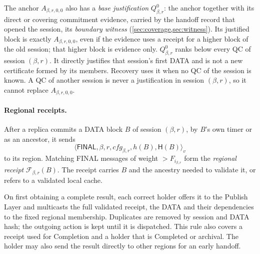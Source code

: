 \documentclass[11pt,a4paper]{article}
\newcommand{\FC}{\mathcal F}
\newcommand{\Hash}{\mathsf H}
\newcommand{\tagg}[1]{\ensuremath{\mathsf{#1}}}
\newcommand{\defterm}[1]{\textcolor{rrBlue}{\textit{#1}}}
\begin{document}
The anchor $A_{\beta,r,0,0}$ also has a \defterm{base justification}
$Q_{\beta,r}^0$: the anchor together with its direct or covering
commitment evidence, carried by the handoff record that opened the
session, its \defterm{boundary witness} (\cref{sec:coverage,sec:witness}). Its justified block is exactly
$A_{\beta,r,0,0}$, even if the evidence uses a receipt for a higher
block of the old session; that higher block is evidence only.
$Q_{\beta,r}^0$ ranks below every QC of session $(\beta,r)$.
It directly justifies that session's first DATA and is not a new
certificate formed by its members. Recovery uses it when no QC of the
session is known. A QC of another session is
never a justification in session $(\beta,r)$, so it cannot replace
$A_{\beta,r,0,0}$.

\paragraph{Regional receipts.}
After a replica commits a DATA block $B$ of session $(\beta,r)$, by $B$'s
own timer or as an ancestor, it sends
\[
 \langle\tagg{FINAL},\beta,r,\mathit{cfg}_{\beta,r},h(B),\Hash(B)\rangle_v
\]
to its region. Matching FINAL messages of weight $>F_{i_{\beta,r}}$ form
the \defterm{regional receipt} $\FC_{\beta,r}(B)$. The receipt carries
$B$ and the ancestry needed to validate it, or refers to a validated
local cache.

On first obtaining a complete result, each correct holder offers it to
the Publish Layer and multicasts the full validated receipt, the DATA
and their dependencies to the fixed regional membership. Duplicates are
removed by session and DATA hash; the outgoing action is kept until it
is dispatched. This rule also covers a receipt used for Completion and
a holder that is Completed or archival. The holder may also send the
result directly to other regions for an early handoff.
\end{document}

